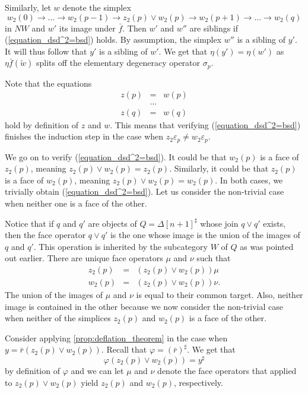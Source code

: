 Similarly, let $w$ denote the simplex
\[w_2(0)\to \dots \to w_2(p-1)\to z_2(p)\vee w_2(p)\to w_2(p+1)\to \dots \to w_2(q)\]
in $NW$ and $w'$ its image under $\bar{f}$. Then $w'$ and $w''$ are siblings if (\ref{equation_dsd^2=bsd}) holds. By assumption, the simplex $w''$ is a sibling of $y'$. It will thus follow that $y'$ is a sibling of $w'$. We get that $\eta (y')=\eta (w')$ as $\eta \bar{f} (\tilde{w} )$ splits off the elementary degeneracy operator $\sigma _p$.

Note that the equations
\begin{displaymath}
\begin{array}{rcl}
z(p) & = & w(p) \\
& \dots \\
z(q) & = & w(q)
\end{array}
\end{displaymath}
hold by definition of $z$ and $w$. This means that verifying (\ref{equation_dsd^2=bsd}) finishes the induction step in the case when $z_2\varepsilon _p\neq w_2\varepsilon _p$.

We go on to verify (\ref{equation_dsd^2=bsd}). It could be that $w_2(p)$ is a face of $z_2(p)$, meaning $z_2(p)\vee w_2(p)=z_2(p)$. Similarly, it could be that $z_2(p)$ is a face of $w_2(p)$, meaning $z_2(p)\vee w_2(p)=w_2(p)$. In both cases, we trivially obtain (\ref{equation_dsd^2=bsd}). Let us consider the non-trivial case when neither one is a face of the other.

Notice that if $q$ and $q'$ are objects of $Q=\Delta [n+1]^\sharp$ whose join $q\vee q'$ exists, then the face operator $q\vee q'$ is the one whose image is the union of the images of $q$ and $q'$. This operation is inherited by the subcategory $W$ of $Q$ as was pointed out earlier. There are unique face operators $\mu$ and $\nu$ such that
\begin{displaymath}
\begin{array}{rcl}
z_2(p) & = & (z_2(p)\vee w_2(p))\mu \\
w_2(p) & = & (z_2(p)\vee w_2(p))\nu .
\end{array}
\end{displaymath}
The union of the images of $\mu$ and $\nu$ is equal to their common target. Also, neither image is contained in the other because we now consider the non-trivial case when neither of the simplices $z_2(p)$ and $w_2(p)$ is a face of the other.

Consider applying \cref{prop:deflation_theorem} in the case when $y=\bar{r} (z_2(p)\vee w_2(p) )$. Recall that $\varphi =(\bar{r} )^\sharp$. We get that
\[\varphi (z_2(p)\vee w_2(p))=y^\sharp \]
by definition of $\varphi$ and we can let $\mu$ and $\nu$ denote the face operators that applied to $z_2(p)\vee w_2(p)$ yield $z_2(p)$ and $w_2(p)$, respectively.

